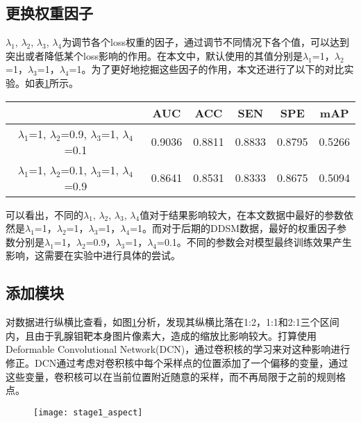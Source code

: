 \subsection{更换权重因子}
$\lambda_{1}$, $\lambda_{2}$, $\lambda_{3}$, $\lambda_{4}$为调节各个loss权重的因子，通过调节不同情况下各个值，可以达到突出或者降低某个loss影响的作用。在本文中，默认使用的其值分别是$\lambda_{1}$=1，$\lambda_{2}$=1，$\lambda_{3}$=1，$\lambda_{4}$=1。为了更好地挖掘这些因子的作用，本文还进行了以下的对比实验。如表\ref{tab:1_stage_lambda_pred_result}所示。
\begin{table}[!htbp]
    \label{tab:1_stage_lambda_pred_result}
    \centering
    \footnotesize%
    \setlength{\tabcolsep}{4pt}%
    \renewcommand{\arraystretch}{1.2}%
    \begin{tabular}{cccccc}
        \hline
        &AUC& ACC &SEN &SPE &mAP \\
        \hline
        $\lambda_{1}$=1, $\lambda_{2}$=0.9, $\lambda_{3}$=1, $\lambda_{4}$=0.1&0.9036 &0.8811 &0.8833  &0.8795 &0.5266 \\
        $\lambda_{1}$=1, $\lambda_{2}$=0.1, $\lambda_{3}$=1, $\lambda_{4}$=0.9&0.8641 &0.8531 &0.8333  &0.8675 &0.5094 \\
        \hline
    \end{tabular}
\end{table}

可以看出，不同的$\lambda_{1}$, $\lambda_{2}$, $\lambda_{3}$, $\lambda_{4}$值对于结果影响较大，在本文数据中最好的参数依然是$\lambda_{1}$=1，$\lambda_{2}$=1，$\lambda_{3}$=1，$\lambda_{4}$=1。而对于后期的DDSM数据，最好的权重因子参数分别是$\lambda_{1}$=1，$\lambda_{2}$=0.9，$\lambda_{3}$=1，$\lambda_{4}$=0.1。不同的参数会对模型最终训练效果产生影响，这需要在实验中进行具体的尝试。

\subsection{添加模块}
对数据进行纵横比查看，如图\ref{fig:stage1_aspect}分析，发现其纵横比落在1:2，1:1和2:1三个区间内，且由于乳腺钼靶本身图片像素大，造成的缩放比影响较大。打算使用Deformable Convolutional Network(DCN)\cite{66dai2017deformable}，通过卷积核的学习来对这种影响进行修正。DCN通过考虑对卷积核中每个采样点的位置添加了一个偏移的变量，通过这些变量，卷积核可以在当前位置附近随意的采样，而不再局限于之前的规则格点。
\begin{figure}[!htbp]
    \centering
    \texttt{[image: stage1\_aspect]}
    \label{fig:stage1_aspect}
\end{figure}

